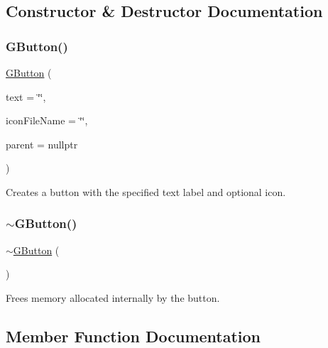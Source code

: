 \subsection{Constructor \& Destructor Documentation}
\mbox{\label{classGButton_aff3f5308477262143eb2a857e7549e31}} 
\subsubsection{\texorpdfstring{G\+Button()}{GButton()}}
{\footnotesize\ttfamily \mbox{\hyperlink{classGButton}{G\+Button}} (\begin{DoxyParamCaption}\item[{const std\+::string \&}]{text = {\ttfamily \char`\"{}\char`\"{}},  }\item[{const std\+::string \&}]{icon\+File\+Name = {\ttfamily \char`\"{}\char`\"{}},  }\item[{Q\+Widget $\ast$}]{parent = {\ttfamily nullptr} }\end{DoxyParamCaption})}



Creates a button with the specified text label and optional icon. 

\mbox{\label{classGButton_a3946882d60361aca156856b7443125df}} 
\subsubsection{\texorpdfstring{$\sim$\+G\+Button()}{~GButton()}}
{\footnotesize\ttfamily $\sim$\mbox{\hyperlink{classGButton}{G\+Button}} (\begin{DoxyParamCaption}{ }\end{DoxyParamCaption})\hspace{0.3cm}{\ttfamily [virtual]}}



Frees memory allocated internally by the button. 



\subsection{Member Function Documentation}
\mbox{\label{classGInteractor_a02f20ea6edfa0671f31c4c648a253833}} 
